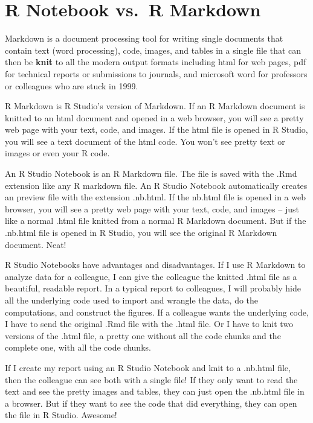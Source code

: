 \documentclass[]{book}
\begin{document}
\hypertarget{r-notebook-vs.-r-markdown}{%
\section{R Notebook vs.~R Markdown}\label{r-notebook-vs.-r-markdown}}

Markdown is a document processing tool for writing single documents that contain text (word processing), code, images, and tables in a single file that can then be \textbf{knit} to all the modern output formats including html for web pages, pdf for technical reports or submissions to journals, and microsoft word for professors or colleagues who are stuck in 1999.

R Markdown is R Studio's version of Markdown. If an R Markdown document is knitted to an html document and opened in a web browser, you will see a pretty web page with your text, code, and images. If the html file is opened in R Studio, you will see a text document of the html code. You won't see pretty text or images or even your R code.

An R Studio Notebook is an R Markdown file. The file is saved with the .Rmd extension like any R markdown file. An R Studio Notebook automatically creates an preview file with the extension .nb.html. If the nb.html file is opened in a web browser, you will see a pretty web page with your text, code, and images -- just like a normal .html file knitted from a normal R Markdown document. But if the .nb.html file is opened in R Studio, you will see the original R Markdown document. Neat!

R Studio Notebooks have advantages and disadvantages. If I use R Markdown to analyze data for a colleague, I can give the colleague the knitted .html file as a beautiful, readable report. In a typical report to colleagues, I will probably hide all the underlying code used to import and wrangle the data, do the computations, and construct the figures. If a colleague wants the underlying code, I have to send the original .Rmd file with the .html file. Or I have to knit two versions of the .html file, a pretty one without all the code chunks and the complete one, with all the code chunks.

If I create my report using an R Studio Notebook and knit to a .nb.html file, then the colleague can see both with a single file! If they only want to read the text and see the pretty images and tables, they can just open the .nb.html file in a browser. But if they want to see the code that did everything, they can open the file in R Studio. Awesome!
\end{document}
